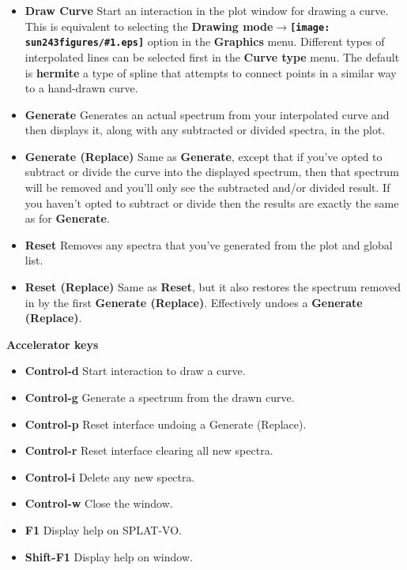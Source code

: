 \documentclass[twoside,11pt]{article}
\newcommand{\htmladdimg}[1]{}
\newcommand{\latexhtml}[2]{#1}
\renewcommand{\_}{\texttt{\symbol{95}}}
\newcommand{\SPLAT}{\textsf{SPLAT-VO}}
\newcommand{\inline}[1]
        {\latexhtml{\texttt{[image: sun243\_figures/\#1.eps]}}
        {\htmladdimg[align=center]{#1.gif}}}
\newcommand{\submenuitem}[2]{\latexhtml{\textbf{#1$\rightarrow$#2}}{\textbf{#1->#2}}}
\newcommand{\labelitem}[1]{\textbf{#1}}
\newcommand{\subheading}[1]{\textbf{\large{#1}}}
\begin{document}
\begin{itemize}

\item \labelitem{Draw Curve} Start an interaction in the plot window for
drawing a curve. This is equivalent to selecting the 
\submenuitem{Drawing mode}{\inline{curve}} option in the
\labelitem{Graphics} menu.
Different types of interpolated lines can be selected first in the
\labelitem{Curve type} menu. The default is
\labelitem{hermite} a type of spline that attempts to connect points in a
similar way to a hand-drawn curve.

\item \labelitem{Generate} Generates an actual spectrum from your interpolated
curve and then displays it, along with any subtracted or divided spectra, in
the plot.

\item \labelitem{Generate (Replace)} Same as \labelitem{Generate}, except that
if you've opted to subtract or divide the curve into the displayed spectrum,
then that spectrum will be removed and you'll only see the subtracted and/or
divided result. If you haven't opted to subtract or divide then the results are
exactly the same as for \labelitem{Generate}.

\item \labelitem{Reset} Removes any spectra that you've generated from the 
plot and global list.

\item \labelitem{Reset (Replace)} Same as \labelitem{Reset}, but it also
restores the spectrum removed in by the first \labelitem{Generate (Replace)}.
Effectively undoes a \labelitem{Generate (Replace)}.

\end{itemize}

\subheading{Accelerator keys}

\begin{itemize}
\item \labelitem{Control-d} Start interaction to draw a curve.
\item \labelitem{Control-g} Generate a spectrum from the drawn curve.
\item \labelitem{Control-p} Reset interface undoing a Generate (Replace).
\item \labelitem{Control-r} Reset interface clearing all new spectra.
\item \labelitem{Control-i} Delete any new spectra.
 
\item \labelitem{Control-w} Close the window.
\item \labelitem{F1} Display help on \SPLAT.     
\item \labelitem{Shift-F1} Display help on window.
\end{itemize}
\end{document}
